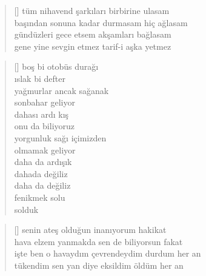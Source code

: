 \documentclass[10pt, openright, twoside]{memoir}
\theoremstyle{definition}
\begin{document}
\vspace*{\fill}
%
\newpage
{}
\vspace*{\fill}
\settowidth{\versewidth}{başından sonuna kadar durmasam hiç ağlasam}
\begin{verse}[\versewidth]
  tüm nihavend şarkıları birbirine ulasam \\
  başından sonuna kadar durmasam hiç ağlasam \\
  gündüzleri gece etsem akşamları bağlasam \\
  gene yine sevgin etmez tarif-i aşka yetmez \\
\end{verse}
\vspace*{\fill}
%
\newpage
{}
\vspace*{\fill}
\settowidth{\versewidth}{yorgunluk sağı içimizden}
\begin{verse}[\versewidth]
  boş bi otobüs durağı \\
  ıslak bi defter \\
  yağmurlar ancak sağanak \\
  sonbahar geliyor \\
  dahası ardı kış \\
  onu da biliyoruz \\
  yorgunluk sağı içimizden \\
  olmamak geliyor \\
  daha da ardışık \\
  dahada değiliz \\
  daha da değiliz \\
  fenikmek solu \\
  solduk \\
\end{verse}
\vspace*{\fill}
%
\newpage
{}
\vspace*{\fill}
\settowidth{\versewidth}{işte ben o havaydım çevrendeydim durdum her an}
\begin{verse}[\versewidth]
  senin ateş olduğun inanıyorum hakikat \\
  hava elzem yanmakda sen de biliyorsun fakat \\
  işte ben o havaydım çevrendeydim durdum her an \\
  tükendim sen yan diye eksildim öldüm her an \\
\end{verse}
\end{document}
